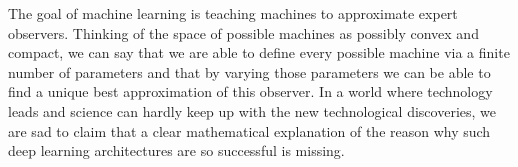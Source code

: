 \documentclass[../2.tex]{subfiles}
\begin{document}
    The goal of machine learning is teaching machines to approximate expert observers.
    Thinking of the space of possible machines as possibly convex and compact, we can say that we are able to define every possible machine
    via a finite number of parameters and that by varying those parameters we can be able to find a unique best approximation of this observer.
    In a world where technology leads and science can hardly keep up with the new technological discoveries, we are sad to claim that a clear mathematical
    explanation of the reason why such deep learning architectures are so successful is missing.
    
    \begin{defn}[relu]
    \end{defn}
    \begin{defn}
    \end{defn}
    \begin{defn}
    \end{defn}
    \begin{defn}
    \end{defn}
    \begin{defn}[CNN]
    \end{defn}
    \begin{defn}
    \end{defn}
\end{document}
